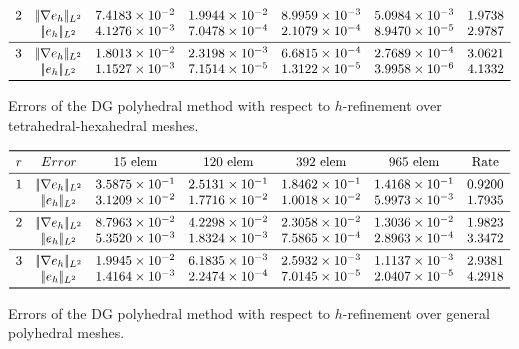 \documentclass[12pt, a4paper]{article}
\theoremstyle{definition}
\theoremstyle{plain}
\theoremstyle{plain}
\begin{document}
\begin{table}[h!]
\[\begin{array}{ccccccc}
	2 & |\!|\nabla e_{h}|\!|_{L^2} & 7.4183 \times 10^{-2} & 1.9944 \times 
	10^{-2} & 8.9959 \times 10^{-3} & 5.0984 \times 10^{-3} & 1.9738\\
	& |\!|e_{h}|\!|_{L^2} & 4.1276 \times 10^{-3} & 7.0478 \times 10^{-4} & 2.1079 \times 10^{-4} & 
	8.9470 \times 10^{-5} & 2.9787\\
	\midrule
	3 & |\!|\nabla e_{h}|\!|_{L^2} & 1.8013 \times 10^{-2} & 2.3198 \times 
	10^{-3} & 6.6815 \times 10^{-4} & 2.7689 \times 10^{-4} & 3.0621\\
	& |\!|e_{h}|\!|_{L^2} & 1.1527 \times 10^{-3} & 7.1514 \times 10^{-5} & 1.3122 \times 10^{-5} & 
	3.9958 \times 10^{-6} & 4.1332\\
	\bottomrule
	\end{array}
	\]
	\caption{Errors of the DG polyhedral method with respect to $h$-refinement over tetrahedral-hexahedral meshes.} \label{tab:hhextet}
	\[
	\begin{array}{ccccccc}
	\toprule
	r & Error & \text{15 elem} & \text{120 elem} & \text{392 elem} & 
	\text{965 elem} & \text{Rate} \\ 
	\midrule
	1 & |\!|\nabla e_{h}|\!|_{L^2} & 3.5875 \times 10^{-1} & 2.5131 \times 
	10^{-1} & 1.8462 \times 10^{-1} & 1.4168 \times 10^{-1} & 0.9200\\
	& |\!|e_{h}|\!|_{L^2} & 3.1209 \times 10^{-2} & 1.7716 \times 10^{-2} & 1.0018 \times 10^{-2} & 
	5.9973 \times 10^{-3} & 1.7935\\
	\midrule
	2 & |\!|\nabla e_{h}|\!|_{L^2} & 8.7963 \times 10^{-2} & 4.2298 \times 
	10^{-2} & 2.3058 \times 10^{-2} & 1.3036 \times 10^{-2} & 1.9823\\
	& |\!|e_{h}|\!|_{L^2} & 5.3520 \times 10^{-3} & 1.8324 \times 10^{-3} & 7.5865 \times 10^{-4} & 2.8963 \times 10^{-4} & 3.3472\\
	\midrule
	3 & |\!|\nabla e_{h}|\!|_{L^2} & 1.9945 \times 10^{-2} & 6.1835 \times 
	10^{-3} & 2.5932 \times 10^{-3} & 1.1137 \times 10^{-3} & 2.9381\\
	& |\!|e_{h}|\!|_{L^2} & 1.4164 \times 10^{-3} & 2.2474 \times 10^{-4} & 7.0145 \times 10^{-5} & 2.0407 \times 10^{-5} & 4.2918\\
	\bottomrule
	\end{array}
	\]
	\caption{Errors of the DG polyhedral method with respect to $h$-refinement over general polyhedral meshes.} \label{tab:hpol}
\end{table}
\end{document}
